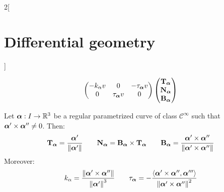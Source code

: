 \documentclass[../../../main.tex]{subfiles}
\begin{document}
\begin{multicols}{2}[\section{Differential geometry}]
\begin{theorem}
$$\begin{pmatrix}
        -k_\alpha v & 0           & -\ta\alpha v \\
        0           & \ta\alpha v & 0
      \end{pmatrix}
      \begin{pmatrix}
        \T\alpha \\
        \N\alpha \\
        \B\alpha \\
      \end{pmatrix}
    $$
  \end{theorem}
  \begin{corollary}
    Let $\vf{\alpha}:I\rightarrow\RR^3$ be a regular parametrized curve of class $\mathcal{C}^\infty$ such that $\vf{\alpha}'\times \vf{\alpha}''\ne 0$. Then:
    $$\T\alpha=\frac{\vf{\alpha}'}{\|\vf{\alpha}'\|}\qquad\N\alpha=\B\alpha\times\T\alpha\qquad\B\alpha=\frac{\vf{\alpha}'\times\vf{\alpha}''}{\|\vf{\alpha}'\times\vf{\alpha}''\|}$$
    Moreover: $$k_\alpha=\frac{\|\vf{\alpha}'\times\vf{\alpha}''\|}{{\|\vf{\alpha}'\|}^3}\qquad\ta\alpha=-\frac{\langle\vf{\alpha}'\times\vf{\alpha}'',\vf{\alpha}'''\rangle}{{\|\vf{\alpha}'\times\vf{\alpha}''\|}^2}$$
  \end{corollary}

\end{multicols}
\end{document}
